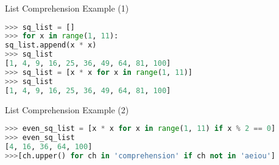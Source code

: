 \begin{frame}[fragile]{List Comprehension Example (1)}
    \begin{lstlisting}[style=colorful, language=Python]
>>> sq_list = []
>>> for x in range(1, 11):
sq_list.append(x * x)
>>> sq_list
[1, 4, 9, 16, 25, 36, 49, 64, 81, 100]
>>> sq_list = [x * x for x in range(1, 11)]
>>> sq_list
[1, 4, 9, 16, 25, 36, 49, 64, 81, 100]
    \end{lstlisting}
\end{frame}

\begin{frame}[fragile]{List Comprehension Example (2)}
    \begin{lstlisting}[style=colorful, language=Python]
>>> even_sq_list = [x * x for x in range(1, 11) if x % 2 == 0]
>>> even_sq_list
[4, 16, 36, 64, 100]
>>>[ch.upper() for ch in 'comprehension' if ch not in 'aeiou']
    \end{lstlisting}
\end{frame}

